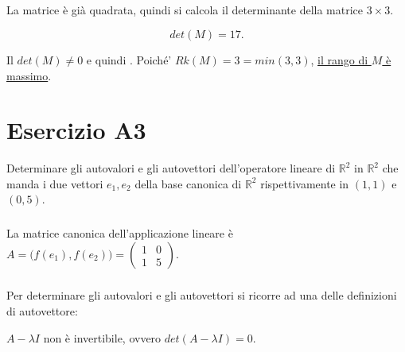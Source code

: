 \documentclass[a4paper]{report}
\newenvironment{problem}
        {
                \begin{mdframed}[topline=false,rightline=false,bottomline=false]
                        \slshape
        }
        {
                \end{mdframed}
        }
\begin{document}
        \paragraph{}
        La matrice \`{e} gi\`{a} quadrata, quindi si calcola il determinante della matrice $ 3 \times 3 $.

        \[
                det(M) = 17.
        \]

        Il $ det(M) \not= 0$ e quindi .
        Poich\'{e}' $ Rk(M) = 3 = min(3,3) $, \ul{il rango di $M$ \`{e} massimo}.


        \chapter*{Esercizio A3}
        \begin{problem}
                Determinare gli autovalori e gli autovettori dell'operatore lineare di $\mathbb{R}^2$ in $\mathbb{R}^2$
                che manda i due vettori $ e_1, e_2 $ della base canonica di $\mathbb{R}^2$ rispettivamente in
                $(1,1)$ e $(0,5)$.
        \end{problem}

        \paragraph{}
        La matrice canonica dell'applicazione lineare \`{e}
        $
                A =     \bigl(f(e_1),f(e_2)\bigr) =
                        \begin{pmatrix}
                                1 & 0 \\
                                1 & 5
                        \end{pmatrix}.
        $

        \paragraph{}
        Per determinare gli autovalori e gli autovettori si ricorre ad una delle definizioni di autovettore:
        \begin{center}
                $ A - \lambda I $ non \`{e} invertibile, ovvero $ det(A - \lambda I) = 0$.
        \end{center}
\end{document}
